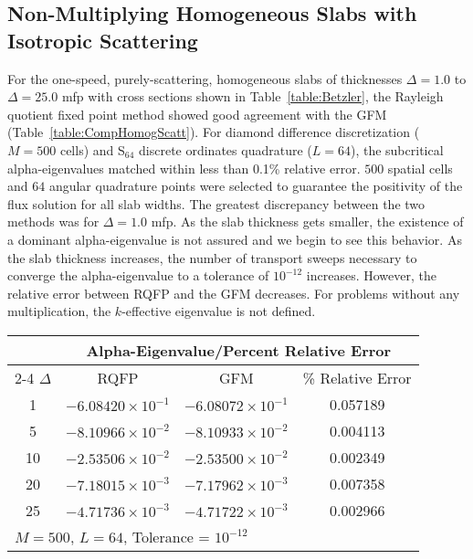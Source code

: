 \subsection{Non-Multiplying Homogeneous Slabs with Isotropic Scattering}
For the one-speed, purely-scattering, homogeneous slabs of thicknesses $\Delta = 1.0$ to $\Delta = 25.0$ mfp with cross sections shown in Table~\ref{table:Betzler}, the Rayleigh quotient fixed point method showed good agreement with the GFM (Table~\ref{table:CompHomogScatt}). For diamond difference discretization ($M = 500$ cells) and S$_{64}$ discrete ordinates quadrature ($L = 64$), the subcritical alpha-eigenvalues matched within less than 0.1\% relative error. $500$ spatial cells and $64$ angular quadrature points were selected to guarantee the positivity of the flux solution for all slab widths. The greatest discrepancy between the two methods was for $\Delta = 1.0$ mfp. As the slab thickness gets smaller, the existence of a dominant alpha-eigenvalue is not assured and we begin to see this behavior. As the slab thickness increases, the number of transport sweeps necessary to converge the alpha-eigenvalue to a tolerance of $10^{-12}$ increases. However, the relative error between RQFP and the GFM decreases. For problems without any multiplication, the $k$-effective eigenvalue is not defined.

\begin{table*}[!htbp]
\centering{}
\caption{Comparison of RQFP- and GFM-calculated alpha-eigenvalues for a homogeneous scattering slab}
\label{table:CompHomogScatt}
\begin{tabular}{@{}cccc@{}}\toprule
& \multicolumn{3}{c}{Alpha-Eigenvalue/Percent Relative Error} \\
\cmidrule{2-4} $\Delta$ & RQFP & GFM & \% Relative Error \\
\midrule
1 & $-6.08420 \times 10^{-1}$ & $-6.08072 \times 10^{-1}$ & 0.057189 \\ 
5 & $-8.10966 \times 10^{-2}$ & $-8.10933 \times 10^{-2}$ & 0.004113 \\ 
10 & $-2.53506 \times 10^{-2}$ & $-2.53500 \times 10^{-2}$ & 0.002349 \\ 
20 & $-7.18015 \times 10^{-3}$ & $-7.17962 \times 10^{-3}$ & 0.007358 \\ 
25 & $-4.71736 \times 10^{-3}$ & $-4.71722 \times 10^{-3}$ & 0.002966 \\ 
\bottomrule
\multicolumn{4}{l}{$M = 500$, $L = 64$, Tolerance = $10^{-12}$} \\
\end{tabular}
\end{table*}

